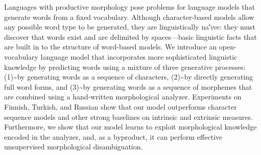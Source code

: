 Languages with productive morphology pose problems for language models that generate words from a fixed vocabulary. Although character-based models allow any possible word type to be generated, they are linguistically na\''{\i}ve: they must discover that words exist and are delimited by spaces---basic linguistic facts that are built in to the structure of word-based models. We introduce an open-vocabulary language model that incorporates more sophisticated linguistic knowledge by predicting words using a mixture of three generative processes: (1){\textasciitilde}by generating words as a sequence of characters, (2){\textasciitilde}by directly generating full word forms, and (3){\textasciitilde}by generating words as a sequence of morphemes that are combined using a hand-written morphological analyzer. Experiments on Finnish, Turkish, and Russian show that our model outperforms character sequence models and other strong baselines on intrinsic and extrinsic measures. Furthermore, we show that our model learns to exploit morphological knowledge encoded in the analyzer, and, as a byproduct, it can perform effective unsupervised morphological disambiguation.
